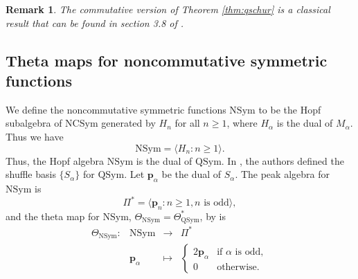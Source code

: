 \documentclass[11pt]{amsart}
\newtheorem{Remark}[Theorem]{Remark}
\numberwithin{equation}{section}
\newcommand{\NSym}{\mathrm{NSym}}
\newcommand{\NCSym}{\mathrm{NCSym}}
\newcommand{\QSym}{\mathrm{QSym}}
\begin{document}
\begin{Remark}
The commutative version of Theorem \ref{thm:qschur} is a classical result that can be found in section 3.8 of \cite{M95}.
\end{Remark}

\subsection{Theta maps for noncommutative symmetric functions}\label{sec:NSym}
We define the noncommutative symmetric functions $\NSym$ to be the Hopf subalgebra of $\NCSym$ generated by $H_{n}$ for all $n\geq 1$, where $H_\alpha$ is the dual of $M_\alpha$. Thus we have
$$\NSym=\langle H_n: n\geq 1\rangle.$$ 
Thus, the Hopf algebra $\NSym$ is the dual of $\QSym$. In \cite[Section 3]{ALi}, the authors defined the shuffle basis $\{S_\alpha\}$ for $\QSym$. Let $\mathbf{p}_\alpha$ be the dual of $S_\alpha$. The peak algebra for $\NSym$ is $$\Pi^*=\langle \mathbf{p}_{n}: n\geq 1, \text{$n$ is odd} \rangle,$$ and the  theta map for $\NSym$, $\Theta_\NSym=\Theta_{\QSym}^*$, by \cite[Theorem 3.8]{ALi} is 
$$\begin{array}{cccc}\Theta_{\NSym}: &\NSym &\rightarrow& \Pi^* \\ & \mathbf{p}_{\alpha} & \mapsto & \begin{cases}
2 \mathbf{p}_{\alpha} & \text{if $\alpha$ is odd},\\ 0 & \text{otherwise.}
\end{cases} \end{array}$$
 
\end{document}
